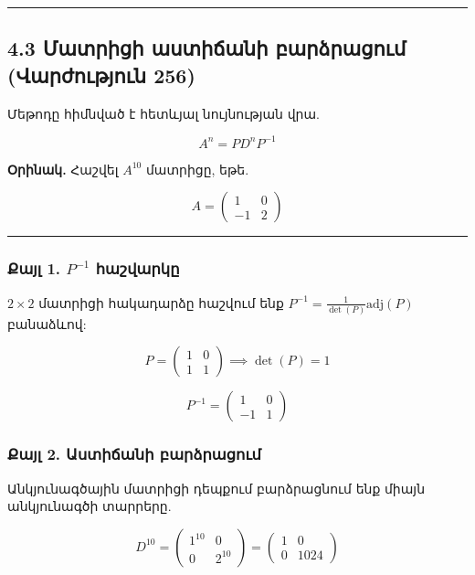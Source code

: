 \documentclass[12pt, a4paper]{article}
\begin{document}
\vspace{1em}
\hrule
\vspace{1em}

\subsection{4.3 Մատրիցի աստիճանի բարձրացում (Վարժություն 256)}

Մեթոդը հիմնված է հետևյալ նույնության վրա.

$$
A^n = P D^n P^{-1}
$$

\textbf{Օրինակ.} Հաշվել $A^{10}$ մատրիցը, եթե.

$$
A = \begin{pmatrix} 1 & 0 \\ -1 & 2 \end{pmatrix}
$$

\vspace{1em}
\hrule
\vspace{1em}

\subsubsection{Քայլ 1. $P^{-1}$ հաշվարկը}

$2 \times 2$ մատրիցի հակադարձը հաշվում ենք $P^{-1} = \frac{1}{\det(P)} \text{adj}(P)$ բանաձևով:

$$
P = \begin{pmatrix} 1 & 0 \\ 1 & 1 \end{pmatrix} \implies \det(P) = 1
$$

$$
P^{-1} = \begin{pmatrix} 1 & 0 \\ -1 & 1 \end{pmatrix}
$$

\subsubsection{Քայլ 2. Աստիճանի բարձրացում}

Անկյունագծային մատրիցի դեպքում բարձրացնում ենք միայն անկյունագծի տարրերը.

$$
D^{10} = \begin{pmatrix} 1^{10} & 0 \\ 0 & 2^{10} \end{pmatrix} = \begin{pmatrix} 1 & 0 \\ 0 & 1024 \end{pmatrix}
$$
\end{document}
